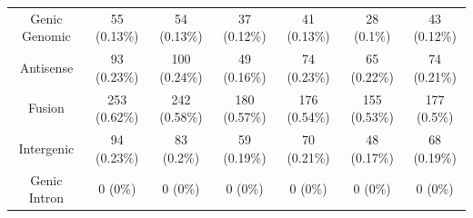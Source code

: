 \begin{landscape}
\begin{table}[]
{\begin{tabular}{@{}ccccccc@{}}
		Genic Genomic                       & 55 (0.13\%)                                                              & 54 (0.13\%)                                                              & 37 (0.12\%)                                                              & 41 (0.13\%)                                                             & 28 (0.1\%)                                                               & 43 (0.12\%)                                                              \\
		Antisense                           & 93 (0.23\%)                                                              & 100 (0.24\%)                                                             & 49 (0.16\%)                                                              & 74 (0.23\%)                                                             & 65 (0.22\%)                                                              & 74 (0.21\%)                                                              \\
		Fusion                              & 253 (0.62\%)                                                             & 242 (0.58\%)                                                             & 180 (0.57\%)                                                             & 176 (0.54\%)                                                            & 155 (0.53\%)                                                             & 177 (0.5\%)                                                              \\
		Intergenic                          & 94 (0.23\%)                                                              & 83 (0.2\%)                                                               & 59 (0.19\%)                                                              & 70 (0.21\%)                                                             & 48 (0.17\%)                                                              & 68 (0.19\%)                                                              \\
		Genic Intron                        & 0 (0\%)                                                                  & 0 (0\%)                                                                  & 0 (0\%)                                                                  & 0 (0\%)                                                                 & 0 (0\%)                                                                  & 0 (0\%)                                                                  \\

\end{tabular}}
\end{table}
\end{landscape}
